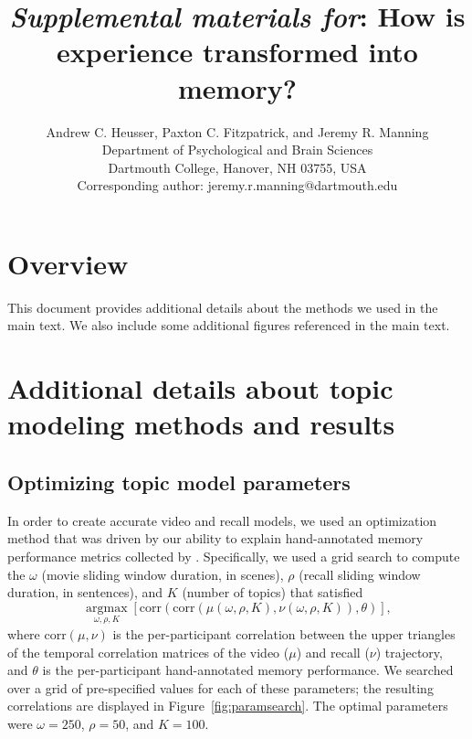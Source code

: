 \documentclass{article}
\title{\textit{Supplemental materials for}: How is experience transformed into memory?}
\author{Andrew C. Heusser, Paxton C. Fitzpatrick, and Jeremy R. Manning\\Department of Psychological and Brain Sciences\\Dartmouth College, Hanover, NH 03755, USA\\Corresponding author: jeremy.r.manning@dartmouth.edu}
\newcommand{\argmax}{\mathop{\mathrm{argmax}}\limits}
\begin{document}
\maketitle

\setcounter{equation}{0}
\setcounter{figure}{0}
\setcounter{table}{0}
\setcounter{page}{1}
\setcounter{section}{0}
\makeatletter
\renewcommand{\theequation}{S\arabic{equation}}
\renewcommand{\thefigure}{S\arabic{figure}}
\renewcommand{\bibnumfmt}[1]{[S#1]}
\renewcommand{\citenumfont}[1]{S#1}


\section*{Overview}
This document provides additional details about the methods we used in the main text.  We also include some additional figures referenced in the main text.

\section*{Additional details about topic modeling methods and results}
\subsection*{Optimizing topic model parameters}
In order to create accurate video and recall models, we used an optimization method that was driven by our ability to explain hand-annotated memory performance metrics collected by \cite{ChenEtal17}.  Specifically, we used a grid search to compute the $\omega$ (movie sliding window duration, in scenes), $\rho$ (recall sliding window duration, in sentences), and $K$ (number of topics) that satisfied
\[
\argmax_{\omega, \rho, K} \left[\mathrm{corr}\left(\mathrm{corr}\left(\mu\left(\omega, \rho, K\right), \nu\left(\omega, \rho, K\right)\right), \theta\right)\right],
\]
where $\mathrm{corr}(\mu, \nu)$ is the per-participant correlation between the upper triangles of the temporal correlation matrices of the video ($\mu$) and recall ($\nu$) trajectory, and $\theta$ is the per-participant hand-annotated memory performance.  We searched over a grid of pre-specified values for each of these parameters; the resulting correlations are displayed in Figure~\ref{fig:paramsearch}.  The optimal parameters were $\omega = 250$, $\rho = 50$, and $K = 100$.
\end{document}
